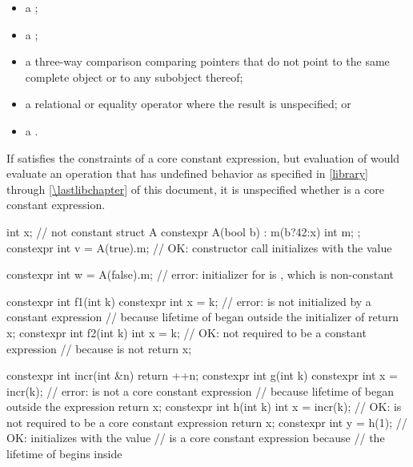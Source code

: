 \begin{itemize}
\item
a ;

\item
a ;

\item
a three-way comparison
comparing pointers that do not point to the same
complete object or to any subobject thereof;

\item
a relational or equality
operator where the result is unspecified; or

\item
a .
\end{itemize}

If  satisfies the constraints of a core constant expression, but
evaluation of  would evaluate an operation that has undefined behavior
as specified in \ref{library} through \ref{\lastlibchapter} of this
document, it is unspecified whether  is a core constant
expression.

\begin{example}
\begin{codeblock}
int x;                              // not constant
struct A {
  constexpr A(bool b) : m(b?42:x) { }
  int m;
};
constexpr int v = A(true).m;        // OK: constructor call initializes  with the value 

constexpr int w = A(false).m;       // error: initializer for  is , which is non-constant

constexpr int f1(int k) {
  constexpr int x = k;              // error:  is not initialized by a constant expression
                                    // because lifetime of  began outside the initializer of 
  return x;
}
constexpr int f2(int k) {
  int x = k;                        // OK: not required to be a constant expression
                                    // because  is not 
  return x;
}

constexpr int incr(int &n) {
  return ++n;
}
constexpr int g(int k) {
  constexpr int x = incr(k);        // error:  is not a core constant expression
                                    // because lifetime of  began outside the expression 
  return x;
}
constexpr int h(int k) {
  int x = incr(k);                  // OK:  is not required to be a core constant expression
  return x;
}
constexpr int y = h(1);             // OK: initializes  with the value 
                                    //  is a core constant expression because
                                    // the lifetime of  begins inside 
\end{codeblock}
\end{example}


